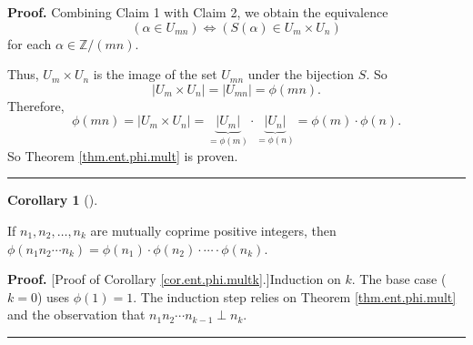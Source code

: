 \documentclass[numbers=enddot,12pt,final,onecolumn,notitlepage]{scrartcl}%
\numberwithin{exer}{subsection}
\theoremstyle{definition}
\newtheorem{coro}[theo]{Corollary}
\newenvironment{corollary}[1][]
{\begin{coro}[#1]\begin{leftbar}}
{\end{leftbar}\end{coro}}
\newenvironment{proof}[1][Proof]{\noindent\textbf{#1.} }{\ \rule{0.5em}{0.5em}}
\begin{document}
\begin{proof}
Combining Claim 1 with Claim 2, we obtain the equivalence%
\[
\left(  \alpha\in U_{mn}\right)  \Longleftrightarrow\left(  S\left(
\alpha\right)  \in U_{m}\times U_{n}\right)
\]
for each $\alpha\in\mathbb{Z}/\left(  mn\right)  $.

Thus, $U_{m}\times U_{n}$ is the image of the set $U_{mn}$ under the bijection
$S$. So%
\[
\left\vert U_{m}\times U_{n}\right\vert =\left\vert U_{mn}\right\vert
=\phi\left(  mn\right)  .
\]
Therefore,%
\[
\phi\left(  mn\right)  =\left\vert U_{m}\times U_{n}\right\vert
=\underbrace{\left\vert U_{m}\right\vert }_{=\phi\left(  m\right)  }%
\cdot\underbrace{\left\vert U_{n}\right\vert }_{=\phi\left(  n\right)  }%
=\phi\left(  m\right)  \cdot\phi\left(  n\right)  .
\]
So Theorem \ref{thm.ent.phi.mult} is proven.
\end{proof}

\begin{corollary}
\label{cor.ent.phi.multk}If $n_{1},n_{2},\ldots,n_{k}$ are mutually coprime
positive integers, then $\phi\left(  n_{1}n_{2}\cdots n_{k}\right)
=\phi\left(  n_{1}\right)  \cdot\phi\left(  n_{2}\right)  \cdot\cdots\cdot
\phi\left(  n_{k}\right)  $.
\end{corollary}

\begin{proof}
[Proof of Corollary \ref{cor.ent.phi.multk}.]Induction on $k$. The base case
($k=0$) uses $\phi\left(  1\right)  =1$. The induction step relies on Theorem
\ref{thm.ent.phi.mult} and the observation that $n_{1}n_{2}\cdots n_{k-1}\perp
n_{k}$.
\end{proof}
\end{document}
